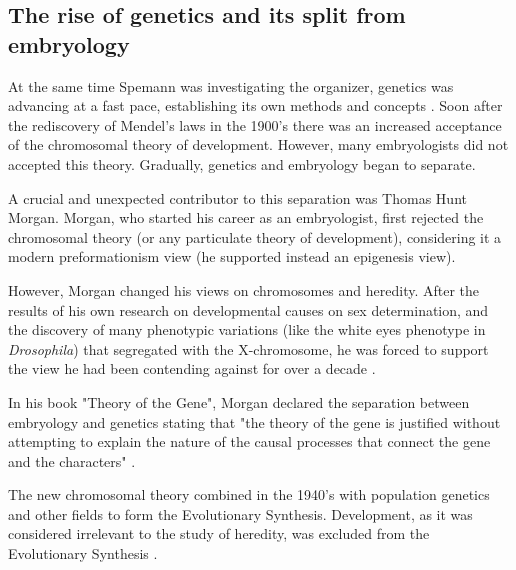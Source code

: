 \subsection{The rise of genetics and its split from embryology}

At the same time Spemann was investigating the organizer, genetics was advancing at a fast pace, establishing its own methods and concepts \citep{gilbert1991conceptual,Horder2001}.
Soon after the rediscovery of Mendel's laws in the 1900's there was an increased acceptance of the chromosomal theory of development. However, many embryologists did not accepted this theory.
Gradually, genetics and embryology began to separate.

A crucial and unexpected contributor to this separation was Thomas Hunt Morgan.
Morgan, who started his career as an embryologist, 
first rejected the chromosomal theory (or any particulate theory of development), considering it a modern preformationism view (he supported instead an epigenesis view).

However, Morgan changed his views on chromosomes and heredity. After the results of his own research on developmental causes on sex determination, and the discovery of many phenotypic variations (like the white eyes phenotype in \textit{Drosophila}) that segregated with the X-chromosome, he was forced to support the view he had been contending against for over a decade \citep{Gilbert1978}.

In his book "Theory of the Gene", Morgan declared the separation between embryology and genetics stating that "the theory of the gene is justified without attempting to explain the nature of the causal processes that connect the gene and the characters" \citep{Morgan1926}.

The new chromosomal theory
combined in the 1940's with population genetics and other fields to form the Evolutionary Synthesis. Development, as it was considered irrelevant to the study of heredity, was excluded from the Evolutionary Synthesis \citep{amundson2005changing}. 

